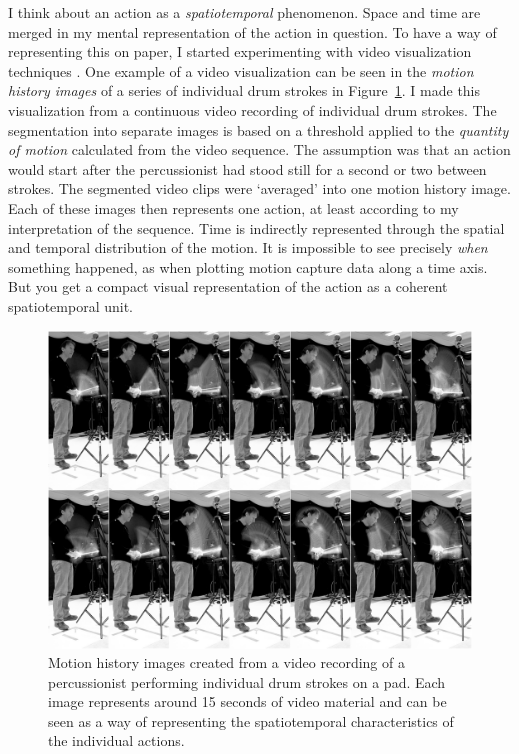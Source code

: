 I think about an action as a \emph{spatiotemporal} phenomenon. Space and time are merged in my mental representation of the action in question. To have a way of representing this on paper, I started experimenting with video visualization techniques \citep{jensenius_video_2013}. One example of a video visualization can be seen in the \emph{motion history images} of a series of individual drum strokes in Figure~\ref{fig:figures_samkopf}. I made this visualization from a continuous video recording of individual drum strokes. The segmentation into separate images is based on a threshold applied to the \emph{quantity of motion} calculated from the video sequence. The assumption was that an action would start after the percussionist had stood still for a second or two between strokes. The segmented video clips were `averaged' into one motion history image. Each of these images then represents one action, at least according to my interpretation of the sequence. Time is indirectly represented through the spatial and temporal distribution of the motion. It is impossible to see precisely \emph{when} something happened, as when plotting motion capture data along a time axis. But you get a compact visual representation of the action as a coherent spatiotemporal unit.

\begin{figure}[tbp]
	\centering
		\includegraphics[width=\columnwidth]{figures/20-percussion.jpg}
	\caption{Motion history images created from a video recording of a percussionist performing individual drum strokes on a pad. Each image represents around 15 seconds of video material and can be seen as a way of representing the spatiotemporal characteristics of the individual actions.}
	\label{fig:figures_samkopf}
\end{figure}

